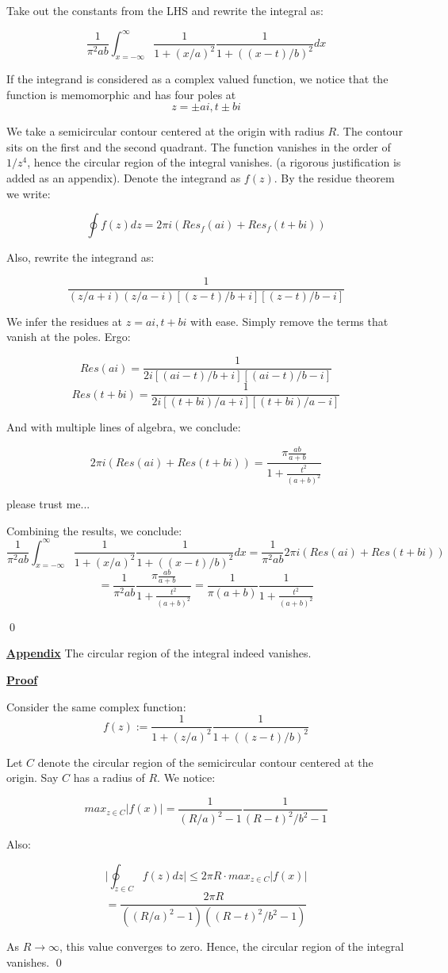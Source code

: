 \documentclass{article}
\newcommand{\new}[1]{
    \vspace{2mm}
    \noindent
    \textbf{
    \underline{#1}}
}
\newcommand{\Proof}{{
    \vspace{2mm}
    \noindent
    \textbf{
    \underline{Proof}}
}
}
\begin{document}
Take out the constants from the LHS and rewrite the integral as:

\[
    \frac{1}{\pi^2 a b}
    \int_{x = -\infty}^{\infty}
        \frac{1}{1+(x/a)^2}
        \frac{1}{1+((x-t)/b)^2}dx
\]

If the integrand is considered as a complex valued function, 
we notice that the function is memomorphic and has four poles at 
\[
    z = \pm ai, t \pm bi \]

We take a semicircular contour centered at the origin with radius $R$.
The contour sits on the first and the second quadrant.  
The function vanishes in the order of $1/z^4$, hence the circular 
region of the integral vanishes. (a rigorous justification is 
added as an appendix). 
Denote the integrand as $f(z)$.
By the residue theorem we write:

\[
    \oint f(z)dz = 2\pi i(Res_f(ai) + Res_f(t + bi))
\]

Also, rewrite the integrand as:

\[
    \frac{1}
    {
        (z/a + i)(z/a - i)
        [(z-t)/b + i][(z-t)/b - i]
    }
\]

We infer the residues at $z = ai, t + bi$ with ease. 
Simply remove the terms that vanish at the poles. Ergo:

\[
    Res(ai) = 
    \frac{1}
    {2i[(ai - t)/b + i][(ai - t)/b - i]}
\]
\[
    Res(t + bi)= 
    \frac{1}
    {2i [(t + bi)/a + i][(t + bi)/a - i]}
\]

And with multiple lines of algebra, we conclude:

\[
    2\pi i (Res(ai)+Res(t + bi))
    = \frac{\pi
    \frac{ab}{a+b}
    }
    {1+\frac{t^2}{(a+b)^2}}
\]
\color{blue}

please trust me...
\color{black}
\newpage

Combining the results, we conclude:
\[
    \frac{1}{\pi^2 a b}
    \int_{x = -\infty}^{\infty}
        \frac{1}{1+(x/a)^2}
        \frac{1}{1+((x-t)/b)^2}dx
    =  
    \frac{1}{\pi^2 ab}
    2\pi i (Res(ai)+Res(t + bi))\]\[
    = \frac{1}{\pi^2 ab}\frac{\pi
    \frac{ab}{a+b}
    }
    {1+\frac{t^2}{(a+b)^2}}
    =\frac{1}{\pi (a+b)}
    \frac{1}{1+ \frac{t^2}{(a+b)^2}}
\]

\qed 

\new{Appendix} The circular region of the integral indeed vanishes. 

\Proof
Consider the same complex function:
\[
    f(z):=
        \frac{1}{1+(z/a)^2}
        \frac{1}{1+((z-t)/b)^2}
    \] 

    Let $C$ denote the circular region of the 
    semicircular contour centered at the origin. 
    Say $C$ has a radius of $R$. We notice:

\[
    max_{z \in C}|f(x)| = 
    \frac{1}{(R/a)^2 - 1}\frac{1}{(R-t)^2/b^2-1}
\]


Also:

\[
    \bigg|\oint_{z\in C} f(z)dz \bigg|
    \leq 2\pi R \cdot max_{z \in C}|f(x)| \]\[
    = \frac{2\pi R}{((R/a)^2 - 1)((R-t)^2/b^2-1)}
\]

As $R \rightarrow \infty$, this value converges to zero. 
Hence, the circular region of the integral vanishes. 
\qed
\end{document}
